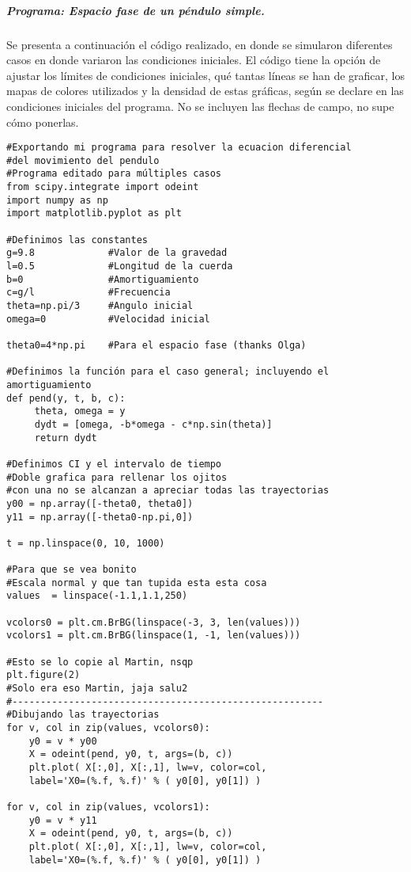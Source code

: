 \documentclass[12pt]{article}
\begin{document}
\subparagraph*{Programa: Espacio fase de un péndulo simple.}

Se presenta a continuación el código realizado, en donde se simularon diferentes casos en donde variaron las condiciones iniciales. El código tiene la opción de ajustar los límites de condiciones iniciales, qué tantas líneas se han de graficar, los mapas de colores utilizados y la densidad de estas gráficas, según se declare en las condiciones iniciales del programa. No se incluyen las flechas de campo, no supe cómo ponerlas. 

{\color{PineGreen}\begin{verbatim}
#Exportando mi programa para resolver la ecuacion diferencial 
#del movimiento del pendulo
#Programa editado para múltiples casos
from scipy.integrate import odeint
import numpy as np
import matplotlib.pyplot as plt

#Definimos las constantes 
g=9.8             #Valor de la gravedad
l=0.5             #Longitud de la cuerda
b=0               #Amortiguamiento
c=g/l             #Frecuencia
theta=np.pi/3     #Angulo inicial
omega=0           #Velocidad inicial

theta0=4*np.pi    #Para el espacio fase (thanks Olga)

#Definimos la función para el caso general; incluyendo el amortiguamiento
def pend(y, t, b, c):
     theta, omega = y
     dydt = [omega, -b*omega - c*np.sin(theta)]
     return dydt

#Definimos CI y el intervalo de tiempo
#Doble grafica para rellenar los ojitos
#con una no se alcanzan a apreciar todas las trayectorias
y00 = np.array([-theta0, theta0])
y11 = np.array([-theta0-np.pi,0])

t = np.linspace(0, 10, 1000)

#Para que se vea bonito
#Escala normal y que tan tupida esta esta cosa
values  = linspace(-1.1,1.1,250)

vcolors0 = plt.cm.BrBG(linspace(-3, 3, len(values)))
vcolors1 = plt.cm.BrBG(linspace(1, -1, len(values)))

#Esto se lo copie al Martin, nsqp
plt.figure(2)
#Solo era eso Martin, jaja salu2
#-------------------------------------------------------
#Dibujando las trayectorias
for v, col in zip(values, vcolors0):
    y0 = v * y00                               
    X = odeint(pend, y0, t, args=(b, c))       
    plt.plot( X[:,0], X[:,1], lw=v, color=col, 
    label='X0=(%.f, %.f)' % ( y0[0], y0[1]) )
    
for v, col in zip(values, vcolors1):
    y0 = v * y11                              
    X = odeint(pend, y0, t, args=(b, c))      
    plt.plot( X[:,0], X[:,1], lw=v, color=col, 
    label='X0=(%.f, %.f)' % ( y0[0], y0[1]) )


\end{verbatim}}
\end{document}
